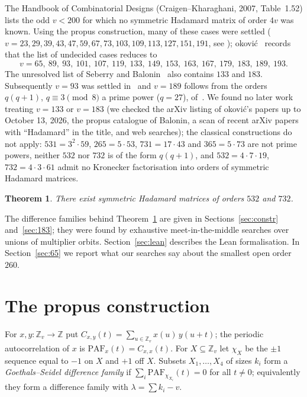 \documentclass[11pt]{article}
\numberwithin{equation}{section}
\newtheorem{theorem}{Theorem}[section]
\theoremstyle{definition}
\theoremstyle{remark}
\newcommand{\Z}{\mathbb Z}
\newcommand{\PAF}{\mathrm{PAF}}
\begin{document}
The Handbook of Combinatorial Designs (Craigen--Kharaghani, 2007, Table~1.52) lists the odd $v<200$
for which no symmetric Hadamard matrix of order $4v$ was known. Using the propus construction, many of
these cases were settled ($v=23,29,39,43,47,59,67,73,103,109,113,127,151,191$, see
\cite{DKK15,BDK18,BD18,ABDK19,Dj22}); \DJ{}okovi\'c~\cite[\S3]{Dj22} records that the list of undecided cases
reduces to
\[ v = 65,\ 89,\ 93,\ 101,\ 107,\ 119,\ 133,\ 149,\ 153,\ 163,\ 167,\ 179,\ 183,\ 189,\ 193. \]
The unresolved list of Seberry and Balonin~\cite[\S4]{SB17} also contains $133$ and $183$.
Subsequently $v=93$ was settled in~\cite{Dj24} and $v=189$ follows from the orders $q(q+1)$,
$q\equiv 3\pmod 8$ a prime power ($q=27$), of~\cite{Dj25}. We found no later work treating $v=133$ or $v=183$
(we checked the arXiv listing of \DJ{}okovi\'c's papers up to October 13, 2026, the propus catalogue of
Balonin, a scan of recent arXiv papers with ``Hadamard'' in the title, and web searches); the classical
constructions do not apply: $531=3^2\cdot 59$, $265=5\cdot53$, $731=17\cdot43$ and $365=5\cdot73$ are not
prime powers, neither $532$ nor $732$ is of the form $q(q+1)$, and $532=4\cdot7\cdot19$, $732=4\cdot3\cdot61$
admit no Kronecker factorisation into orders of symmetric Hadamard matrices.

\begin{theorem}\label{thm:main}
There exist symmetric Hadamard matrices of orders $532$ and $732$.
\end{theorem}

The difference families behind Theorem~\ref{thm:main} are given in Sections~\ref{sec:constr}
and~\ref{sec:183}; they were found by exhaustive meet-in-the-middle searches over unions of multiplier
orbits. Section~\ref{sec:lean}
describes the Lean formalisation. In Section~\ref{sec:65} we report what our searches say about the
smallest open order $260$.

\section{The propus construction}
For $x,y:\Z_v\to\Z$ put $C_{x,y}(t)=\sum_{u\in\Z_v}x(u)\,y(u+t)$; the periodic autocorrelation of $x$
is $\PAF_x(t)=C_{x,x}(t)$. For $X\subseteq\Z_v$ let $\chi_X$ be the $\pm1$ sequence equal to $-1$ on $X$
and $+1$ off $X$. Subsets $X_1,\dots,X_4$ of sizes $k_i$ form a \emph{Goethals--Seidel difference family}
if $\sum_i\PAF_{\chi_{X_i}}(t)=0$ for all $t\ne0$; equivalently they form a difference family with
$\lambda=\sum k_i-v$.
\end{document}
